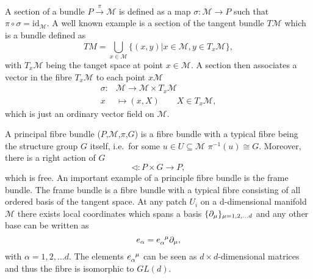 A section of a bundle $P\overset{\pi}{\longrightarrow}\mathcal{M}$ is defined as a map $\sigma: \mathcal{M}\to P$ such that $\pi\circ\sigma = \text{id}_{\mathcal{M}}$. A well known example is a section of the tangent bundle $T\mathcal{M}$ which is a bundle defined as
\begin{equation}
    TM = \bigcup_{x\in \mathcal{M}}\{(x,y)|x\in\mathcal{M}, y\in T_x\mathcal{M} \},
\end{equation}
with $T_x\mathcal{M}$ being the tanget space at point $x\in\mathcal{M}$. A section then associates a vector in the fibre $T_x\mathcal{M}$ to each point $x\mathcal{M}$
\begin{equation}
    \begin{aligned}
        \sigma: &\mathcal{M}\to \mathcal{M}\times T_x\mathcal{M}\\
                x&\mapsto (x,X)\qquad X\in T_x\mathcal{M},
    \end{aligned}
\end{equation}
which is just an ordinary vector field on $\mathcal{M}$. 


A principal fibre bundle ($P$,$\mathcal{M}$,$\pi$,$G$) is a fibre bundle with a typical fibre being the structure group $G$ itself, i.e.\ for some $u\in U\subseteq \mathcal{M}$ $\pi^{-1}(u)\cong G$. Moreover, there is a right action of $G$
\begin{equation}
    \triangleleft: P\times G \to P,
\end{equation}
which is free. An important example of a principle fibre bundle is the frame bundle. The frame bundle is a fibre bundle with a typical fibre consisting of all ordered basis of the tangent space. At any patch $U_i$ on a d-dimensional manifold $\mathcal{M}$ there exists local coordinates which spans a basis $\{\partial_\mu\}_{\mu=1,2,\ldots d}$ and any other base can be written as 
\begin{equation}
    e_\alpha = \tensor{e}{_\alpha^\mu}\pd_\mu,
\end{equation}
with $\alpha=1,2,\ldots d$. The elements $\tensor{e}{_\alpha^\mu}$ can be seen as $d\times d$-dimensional matrices and thus the fibre is isomorphic to $GL(d)$. 


